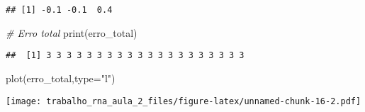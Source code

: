 \documentclass[
]{article}
\newenvironment{Shaded}{\begin{snugshade}}{\end{snugshade}}
\newcommand{\AttributeTok}[1]{\textcolor[rgb]{0.77,0.63,0.00}{#1}}
\newcommand{\CommentTok}[1]{\textcolor[rgb]{0.56,0.35,0.01}{\textit{#1}}}
\newcommand{\FunctionTok}[1]{\textcolor[rgb]{0.00,0.00,0.00}{#1}}
\newcommand{\NormalTok}[1]{#1}
\newcommand{\StringTok}[1]{\textcolor[rgb]{0.31,0.60,0.02}{#1}}
\begin{document}
\begin{verbatim}
## [1] -0.1 -0.1  0.4
\end{verbatim}

\begin{Shaded}
\begin{Highlighting}[]
\CommentTok{\# Erro total}
\FunctionTok{print}\NormalTok{(erro\_total)}
\end{Highlighting}
\end{Shaded}

\begin{verbatim}
##  [1] 3 3 3 3 3 3 3 3 3 3 3 3 3 3 3 3 3 3 3 3
\end{verbatim}

\begin{Shaded}
\begin{Highlighting}[]
\FunctionTok{plot}\NormalTok{(erro\_total,}\AttributeTok{type=}\StringTok{"l"}\NormalTok{)}
\end{Highlighting}
\end{Shaded}

\texttt{[image: trabalho\_rna\_aula\_2\_files/figure-latex/unnamed-chunk-16-2.pdf]}
\end{document}
